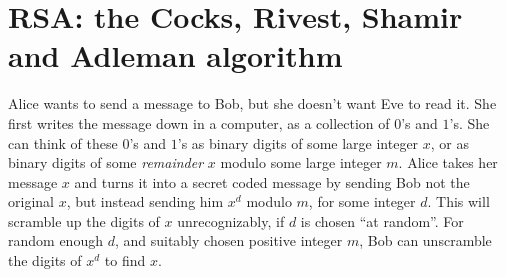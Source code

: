 \section{RSA: the Cocks, Rivest, Shamir and Adleman algorithm}
\begin{example}
Alice wants to send a message to Bob, but she doesn't want Eve to read it.
She first writes the message down in a computer, as a collection of \(0\)'s and \(1\)'s.
She can think of these \(0\)'s and \(1\)'s as binary digits of some large integer \(x\), or as binary digits of some \emph{remainder} \(x\) modulo some large integer \(m\).
Alice takes her message \(x\) and turns it into a secret coded message by sending Bob not the original \(x\), but instead sending him \(x^d\) modulo \(m\), for some integer \(d\).
This will scramble up the digits of \(x\) unrecognizably, if \(d\) is chosen ``at random''.
For random enough \(d\), and suitably chosen positive integer \(m\), Bob can unscramble the digits of \(x^d\) to find \(x\).
\end{example}
